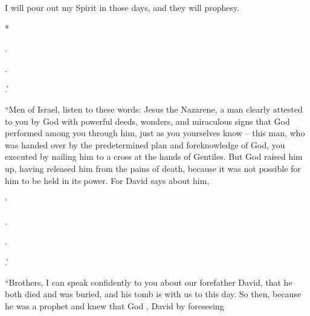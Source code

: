{{{I will pour out
my
Spirit
in
those
days,
and
they will prophesy}}.
\par }{\Q {}*
\par }{
\par }{.
\par }{\Q {}
\par }{
\par }{.
\par }{\Q {}.’
\par }{\PP {}“Men
of Israel,
listen
to these
words: Jesus
the Nazarene,
a man
clearly attested
to
you
by
God
with powerful deeds,
wonders,
and
miraculous signs
that
God
performed
among
you
through
him,
just
as you
yourselves
know –
this
man, who was handed over by the predetermined
plan
and
foreknowledge
of God,
you executed
by
nailing
him to a cross
at the hands
of Gentiles.
But God
raised
him up,
having released
him from the pains
of death,
because
it was
not
possible
for him
to be held
in
its power.
For
David
says
about
him,
\par }{\Q ‘{}
\par }{.
\par }{\Q {}
\par }{
\par }{\Q {}
\par }{.
\par }{\Q {}
\par }{.’
\par }{\PP {}“Brothers,
I can
speak
confidently
to
you
about
our forefather
David,
that
he
both
died
and
was buried,
and
his
tomb
is
with
us
to
this
day.
So
then, because he was
a prophet
and
knew
that
God
{}
{},
David by foreseeing
}
